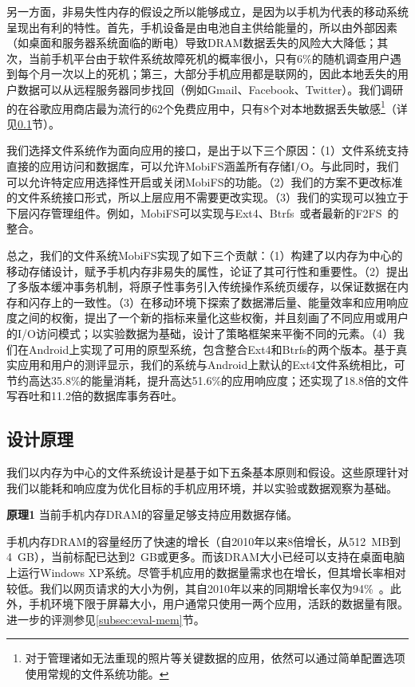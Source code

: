 另一方面，非易失性内存的假设之所以能够成立，是因为以手机为代表的移动系统呈现出有利的特性。首先，手机设备是由电池自主供给能量的，所以由外部因素（如桌面和服务器系统面临的断电）导致DRAM数据丢失的风险大大降低；其次，当前手机平台由于软件系统故障死机的概率很小，只有6\%的随机调查用户遇到每个月一次以上的死机；第三，大部分手机应用都是联网的，因此本地丢失的用户数据可以从远程服务器同步找回（例如Gmail、Facebook、Twitter）。我们调研的在谷歌应用商店最为流行的62个免费应用中，只有8个对本地数据丢失敏感\footnote{对于管理诸如无法重现的照片等关键数据的应用，依然可以通过简单配置选项使用常规的文件系统功能。}（详见\ref{subsec:insight}节）。

我们选择文件系统作为面向应用的接口，是出于以下三个原因：（1）文件系统支持直接的应用访问和数据库，可以允许MobiFS涵盖所有存储I/O。与此同时，我们可以允许特定应用选择性开启或关闭MobiFS的功能。（2）我们的方案不更改标准的文件系统接口形式，所以上层应用不需要更改实现。（3）我们的实现可以独立于下层闪存管理组件。例如，MobiFS可以实现与Ext4、Btrfs~\cite{Rodeh:2013:BLB:2501620.2501623}或者最新的F2FS~\cite{188454}的整合。

总之，我们的文件系统MobiFS实现了如下三个贡献：（1）构建了以内存为中心的移动存储设计，赋予手机内存非易失的属性，论证了其可行性和重要性。（2）提出了多版本缓冲事务机制，将原子性事务引入传统操作系统页缓存，以保证数据在内存和闪存上的一致性。（3）在移动环境下探索了数据滞后量、能量效率和应用响应度之间的权衡，提出了一个新的指标来量化这些权衡，并且刻画了不同应用或用户的I/O访问模式；以实验数据为基础，设计了策略框架来平衡不同的元素。（4）我们在Android上实现了可用的原型系统，包含整合Ext4和Btrfs的两个版本。基于真实应用和用户的测评显示，我们的系统与Android上默认的Ext4文件系统相比，可节约高达35.8\%的能量消耗，提升高达51.6\%的应用响应度；还实现了18.8倍的文件写吞吐和11.2倍的数据库事务吞吐。

\subsection{设计原理}
\label{subsec:insight}

我们以内存为中心的文件系统设计是基于如下五条基本原则和假设。这些原理针对我们以能耗和响应度为优化目标的手机应用环境，并以实验或数据观察为基础。

\textbf{原理1} 当前手机内存DRAM的容量足够支持应用数据存储。

手机内存DRAM的容量经历了快速的增长（自2010年以来8倍增长，从512~MB到4~GB），当前标配已达到2~GB或更多。而该DRAM大小已经可以支持在桌面电脑上运行Windows XP系统。尽管手机应用的数据量需求也在增长，但其增长率相对较低。我们以网页请求的大小为例，其自2010年以来的同期增长率仅为94\%~\cite{HTTP:Transfer:2013}。此外，手机环境下限于屏幕大小，用户通常只使用一两个应用，活跃的数据量有限。进一步的评测参见\ref{subsec:eval-mem}节。

